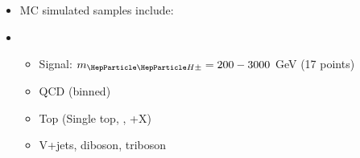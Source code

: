 {  \vspace{0.15cm}

  \begin{itemize}
    \small
  \item MC simulated samples include:
  \end{itemize}
  \twoColumnsAsymAlt
      {
        \begin{itemize}          
          \vspace{-0.35cm}
        \item[ ]
          \begin{itemize}
            \footnotesize
          \item Signal: $\mHpm = 200 - 3000$ GeV (17 points)
          \item QCD (\HT binned)
          \item Top (Single top, \ttbar, \ttbar+X)
          \item V+jets, diboson, triboson
          \end{itemize}
      \end{itemize}
      }
      {

      }
}


